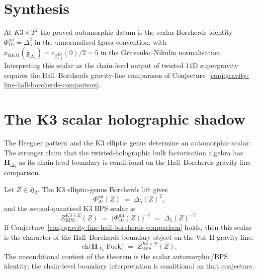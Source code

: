 \section{Synthesis}
\label{sec:thqg-new}

\begin{remark}
\label{rem:thqg-K3-1loop-origin}
At $K3\times T^2$ the proved automorphic datum is the scalar
Borcherds identity $\Phi_{10}^{\mathrm{un}}=\Delta_5^2$ in the
unnormalised Igusa convention, with
$\kappa_{\mathrm{BKM}}(\mathfrak g_{\Delta_5})
=c_{\phi_{0,1}^{K3}}(0)/2=5$ in the
Gritsenko--Nikulin normalisation. Interpreting this scalar as the
chain-level output of twisted $11$D supergravity requires the
Hall--Borcherds gravity-line comparison of
Conjecture~\ref{conj:gravity-line-hall-borcherds-comparison}.
\end{remark}

\section{The K3 scalar holographic shadow}
\label{sec:thqg-allloop-bulk-boundary}

The Heegner pattern and the K3 elliptic genus determine an
automorphic scalar. The stronger claim that the twisted-holographic
bulk factorisation algebra has $\mathbf H_{\Delta_5}$ as its
chain-level boundary is conditional on the Hall--Borcherds
gravity-line comparison.

\begin{theorem}
\label{thm:thqg-allloop-bulk-boundary-duality}
Let $Z\in\mathfrak H_2$. The K3 elliptic-genus Borcherds lift gives
\begin{equation}\label{eq:thqg-allloop-zbulk}
\Phi_{10}^{\mathrm{un}}(Z)
\;=\;
\Delta_5(Z)^2,
\end{equation}
and the second-quantised K3 BPS scalar is
\begin{equation}\label{eq:thqg-allloop-zboundary}
 Z^{K3\times E}_{\mathrm{BPS}}(Z)
 \;=\;
 \bigl(\Phi_{10}^{\mathrm{un}}(Z)\bigr)^{-1}
 \;=\;
 \Delta_5(Z)^{-2}.
\end{equation}
If Conjecture~\ref{conj:gravity-line-hall-borcherds-comparison}
holds, then this scalar is the character of the Hall--Borcherds
boundary object on the Vol~II gravity line:
\begin{equation}\label{eq:thqg-allloop-bulk-boundary}
\mathrm{ch}\bigl(\mathbf H_{\Delta_5}\text{-Fock}\bigr)
\;=\;
Z^{K3\times E}_{\mathrm{BPS}}(Z).
\end{equation}
The unconditional content of the theorem is the scalar
automorphic/BPS identity; the chain-level boundary interpretation is
conditional on that conjecture.
\end{theorem}

